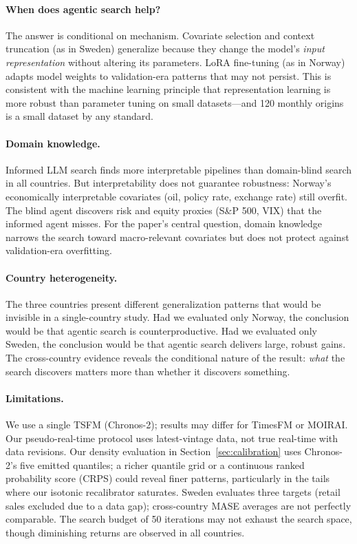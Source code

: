 \documentclass[12pt,a4paper]{article}
\begin{document}
\paragraph{When does agentic search help?}
The answer is conditional on mechanism. Covariate selection and context truncation (as in Sweden) generalize because they change the model's \emph{input representation} without altering its parameters. LoRA fine-tuning (as in Norway) adapts model weights to validation-era patterns that may not persist. This is consistent with the machine learning principle that representation learning is more robust than parameter tuning on small datasets---and 120 monthly origins is a small dataset by any standard.

\paragraph{Domain knowledge.}
Informed LLM search finds more interpretable pipelines than domain-blind search in all countries. But interpretability does not guarantee robustness: Norway's economically interpretable covariates (oil, policy rate, exchange rate) still overfit. The blind agent discovers risk and equity proxies (S\&P 500, VIX) that the informed agent misses. For the paper's central question, domain knowledge narrows the search toward macro-relevant covariates but does not protect against validation-era overfitting.

\paragraph{Country heterogeneity.}
The three countries present different generalization patterns that would be invisible in a single-country study. Had we evaluated only Norway, the conclusion would be that agentic search is counterproductive. Had we evaluated only Sweden, the conclusion would be that agentic search delivers large, robust gains. The cross-country evidence reveals the conditional nature of the result: \emph{what} the search discovers matters more than whether it discovers something.

\paragraph{Limitations.}
We use a single TSFM (Chronos-2); results may differ for TimesFM or MOIRAI. Our pseudo-real-time protocol uses latest-vintage data, not true real-time with data revisions. Our density evaluation in Section~\ref{sec:calibration} uses Chronos-2's five emitted quantiles; a richer quantile grid or a continuous ranked probability score (CRPS) could reveal finer patterns, particularly in the tails where our isotonic recalibrator saturates. Sweden evaluates three targets (retail sales excluded due to a data gap); cross-country MASE averages are not perfectly comparable. The search budget of 50 iterations may not exhaust the search space, though diminishing returns are observed in all countries.
\end{document}
